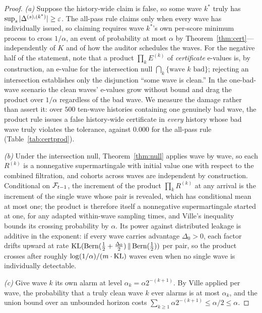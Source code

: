 \begin{proof}
\emph{(a)} Suppose the history-wide claim is false, so some wave $k^\ast$ truly has
$\sup_s |\Delta^{(s),(k^\ast)}| \ge \varepsilon$. The all-pass rule claims only when every
wave has individually issued, so claiming requires wave $k^\ast$'s own per-score
minimum process to cross $1/\alpha$, an event of probability at most $\alpha$ by
Theorem~\ref{thm:cert}---independently of $K$ and of how the auditor schedules the
waves. For the negative half of the statement, note that a product
$\prod_k E^{(k)}$ of \emph{certificate} e-values is, by construction, an e-value for
the intersection null $\bigcap_k \{\text{wave } k \text{ bad}\}$; rejecting an
intersection establishes only the disjunction ``some wave is clean.'' In the
one-bad-wave scenario the clean waves' e-values grow without bound and drag the
product over $1/\alpha$ regardless of the bad wave. We measure the damage rather than
assert it: over $500$ ten-wave histories containing one genuinely bad wave, the
product rule issues a false history-wide certificate in \emph{every} history whose bad
wave truly violates the tolerance, against $0.000$ for the all-pass rule
(Table~\ref{tab:certprod}).

\emph{(b)} Under the intersection null, Theorem~\ref{thm:null} applies wave by wave,
so each $R^{(k)}$ is a nonnegative supermartingale with initial value one with respect
to the combined filtration, and cohorts across waves are independent by construction.
Conditional on $\mathcal{F}_{t-1}$, the increment of the product
$\prod_k R^{(k)}$ at any arrival is the increment of the single wave whose pair is
revealed, which has conditional mean at most one; the product is therefore itself a
nonnegative supermartingale started at one, for any adapted within-wave sampling times,
and Ville's inequality bounds its crossing probability by $\alpha$. Its power against
distributed leakage is additive in the exponent: if every wave carries advantage
$\Delta_0 > 0$, each factor drifts upward at rate
$\mathrm{KL}(\mathrm{Bern}(\tfrac12 + \tfrac{\Delta_0}2) \,\|\, \mathrm{Bern}(\tfrac12))$ per pair, so the
product crosses after roughly $\log(1/\alpha)/(m \cdot \mathrm{KL})$ waves even when no single
wave is individually detectable.

\emph{(c)} Give wave $k$ its own alarm at level $\alpha_k = \alpha 2^{-(k+1)}$. By
Ville applied per wave, the probability that a truly clean wave $k$ ever alarms is at
most $\alpha_k$, and the union bound over an unbounded horizon costs
$\sum_{k \ge 1} \alpha 2^{-(k+1)} \le \alpha/2 \le \alpha$.
\end{proof}

